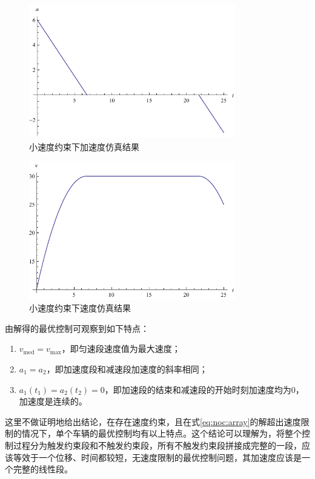 \begin{figure}[htbp]
\centering
\includegraphics[width=9cm]{figures/vopt/sa.pdf}
\caption{小速度约束下加速度仿真结果}
\label{fig:sa}
\end{figure}
\begin{figure}[htbp]
\centering
\includegraphics[width=9cm]{figures/vopt/sv.pdf}
\caption{小速度约束下速度仿真结果}
\label{fig:sv}
\end{figure}

由解得的最优控制可观察到如下特点：
\begin{enumerate}[label=(\arabic*)]
\item $v_\mathrm{med}=v_{\max}$，即匀速段速度值为最大速度；
\item $a_1=a_2$，即加速度段和减速段加速度的斜率相同；
\item $a_1(t_1)=a_2(t_2)=0$，即加速段的结束和减速段的开始时刻加速度均为0，加速度是连续的。
\end{enumerate}

这里不做证明地给出结论，在存在速度约束，且在式\eqref{eq:noc:array}的解超出速度限制的情况下，单个车辆的最优控制均有以上特点。这个结论可以理解为，将整个控制过程分为触发约束段和不触发约束段，所有不触发约束段拼接成完整的一段，应该等效于一个位移、时间都较短，无速度限制的最优控制问题，其加速度应该是一个完整的线性段。

